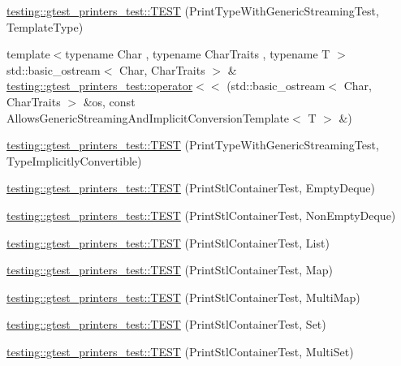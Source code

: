 \begin{DoxyCompactItemize}
\item 
\hyperlink{namespacetesting_1_1gtest__printers__test_a6e180c85f307712a995985f7bc735fd1}{testing\+::gtest\+\_\+printers\+\_\+test\+::\+T\+E\+ST} (Print\+Type\+With\+Generic\+Streaming\+Test, Template\+Type)
\item 
{\footnotesize template$<$typename Char , typename Char\+Traits , typename T $>$ }\\std\+::basic\+\_\+ostream$<$ Char, Char\+Traits $>$ \& \hyperlink{namespacetesting_1_1gtest__printers__test_a09eedfbca613302efe6438d2a537f419}{testing\+::gtest\+\_\+printers\+\_\+test\+::operator$<$$<$} (std\+::basic\+\_\+ostream$<$ Char, Char\+Traits $>$ \&os, const Allows\+Generic\+Streaming\+And\+Implicit\+Conversion\+Template$<$ T $>$ \&)
\item 
\hyperlink{namespacetesting_1_1gtest__printers__test_a68877c5e1ec7a53281798310c30e1776}{testing\+::gtest\+\_\+printers\+\_\+test\+::\+T\+E\+ST} (Print\+Type\+With\+Generic\+Streaming\+Test, Type\+Implicitly\+Convertible)
\item 
\hyperlink{namespacetesting_1_1gtest__printers__test_a1ce10b8a3634e0f6bfbfbb5888c04a95}{testing\+::gtest\+\_\+printers\+\_\+test\+::\+T\+E\+ST} (Print\+Stl\+Container\+Test, Empty\+Deque)
\item 
\hyperlink{namespacetesting_1_1gtest__printers__test_a249d482cf4a1525bd043489dcbd3e200}{testing\+::gtest\+\_\+printers\+\_\+test\+::\+T\+E\+ST} (Print\+Stl\+Container\+Test, Non\+Empty\+Deque)
\item 
\hyperlink{namespacetesting_1_1gtest__printers__test_aaa135672ff79ecaef82c6046f2ab8d29}{testing\+::gtest\+\_\+printers\+\_\+test\+::\+T\+E\+ST} (Print\+Stl\+Container\+Test, List)
\item 
\hyperlink{namespacetesting_1_1gtest__printers__test_a3d701a1866f260a42411e9041894c49c}{testing\+::gtest\+\_\+printers\+\_\+test\+::\+T\+E\+ST} (Print\+Stl\+Container\+Test, Map)
\item 
\hyperlink{namespacetesting_1_1gtest__printers__test_a8a498c956a5b1c0358d126e1ad56fac0}{testing\+::gtest\+\_\+printers\+\_\+test\+::\+T\+E\+ST} (Print\+Stl\+Container\+Test, Multi\+Map)
\item 
\hyperlink{namespacetesting_1_1gtest__printers__test_abdc498462741033074f8e86b7c0bd480}{testing\+::gtest\+\_\+printers\+\_\+test\+::\+T\+E\+ST} (Print\+Stl\+Container\+Test, Set)
\item 
\hyperlink{namespacetesting_1_1gtest__printers__test_adaa3e1cfa3feca377b3958edb41fc0f1}{testing\+::gtest\+\_\+printers\+\_\+test\+::\+T\+E\+ST} (Print\+Stl\+Container\+Test, Multi\+Set)

\end{DoxyCompactItemize}
